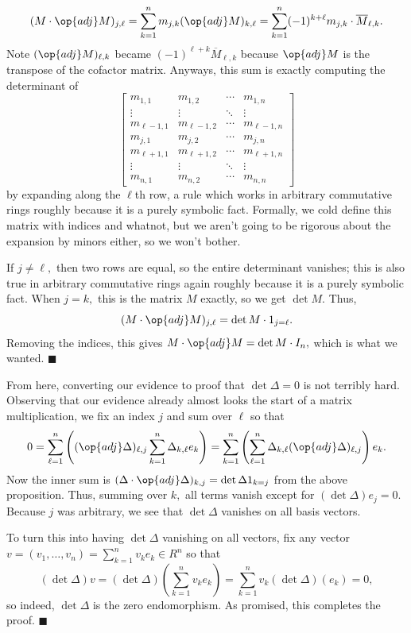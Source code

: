 \[(M\cdot\op{adj}M)_{j,\ell}=\sum_{k=1}^nm_{j,k}(\op{adj}M)_{k,\ell}=\sum_{k=1}^n(-1)^{k+\ell}m_{j,k}\cdot\overline M_{\ell,k}.\]
Note $(\op{adj}M)_{\ell,k}$ became $(-1)^{\ell+k}\overline M_{\ell,k}$ because $\op{adj}M$ is the transpose of the cofactor matrix. Anyways, this sum is exactly computing the determinant of
\[\begin{bmatrix}
    m_{1,1} & m_{1,2} & \cdots & m_{1,n} \\
    \vdots & \vdots & \ddots & \vdots \\
    m_{\ell-1,1} & m_{\ell-1,2} & \cdots & m_{\ell-1,n} \\
    m_{j,1} & m_{j,2} & \cdots & m_{j,n} \\
    m_{\ell+1,1} & m_{\ell+1,2} & \cdots & m_{\ell+1,n} \\
    \vdots & \vdots & \ddots & \vdots \\
    m_{n,1} & m_{n,2} & \cdots & m_{n,n}
\end{bmatrix}\]
by expanding along the $\ell$th row, a rule which works in arbitrary commutative rings roughly because it is a purely symbolic fact. Formally, we cold define this matrix with indices and whatnot, but we aren't going to be rigorous about the expansion by minors either, so we won't bother.

If $j\ne\ell,$ then two rows are equal, so the entire determinant vanishes; this is also true in arbitrary commutative rings again roughly because it is a purely symbolic fact. When $j=k,$ this is the matrix $M$ exactly, so we get $\det M.$ Thus,
\[(M\cdot\op{adj}M)_{j,\ell}=\det M\cdot1_{j=\ell}.\]
Removing the indices, this gives $M\cdot\op{adj}M=\det M\cdot I_n,$ which is what we wanted. $\blacksquare$

From here, converting our evidence to proof that $\det\Delta=0$ is not terribly hard. Observing that our evidence already almost looks the start of a matrix multiplication, we fix an index $j$ and sum over $\ell$ so that
\[0=\sum_{\ell=1}^n\left((\op{adj}\Delta)_{\ell,j}\sum_{k=1}^n\Delta_{k,\ell}e_k\right)=\sum_{k=1}^n\left(\sum_{\ell=1}^n\Delta_{k,\ell}(\op{adj}\Delta)_{\ell,j}\right)e_k.\]
Now the inner sum is $(\Delta\cdot\op{adj}\Delta)_{k,j}=\det\Delta1_{k=j}$ from the above proposition. Thus, summing over $k,$ all terms vanish except for $(\det\Delta)e_j=0.$ Because $j$ was arbitrary, we see that $\det\Delta$ vanishes on all basis vectors.

To turn this into having $\det\Delta$ vanishing on all vectors, fix any vector $v=(v_1,\ldots,v_n)=\sum_{k=1}^nv_ke_k\in R^n$ so that
\[(\det\Delta)v=(\det\Delta)\left(\sum_{k=1}^nv_ke_k\right)=\sum_{k=1}^nv_k(\det\Delta)(e_k)=0,\]
so indeed, $\det\Delta$ is the zero endomorphism. As promised, this completes the proof. $\blacksquare$

